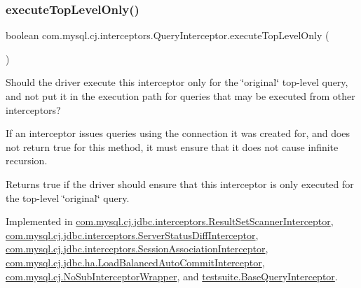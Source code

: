 \mbox{\label{interfacecom_1_1mysql_1_1cj_1_1interceptors_1_1_query_interceptor_ab12edf90713df907ba400dbe3ba03ea6}} 
\subsubsection{\texorpdfstring{execute\+Top\+Level\+Only()}{executeTopLevelOnly()}}
{\footnotesize\ttfamily boolean com.\+mysql.\+cj.\+interceptors.\+Query\+Interceptor.\+execute\+Top\+Level\+Only (\begin{DoxyParamCaption}{ }\end{DoxyParamCaption})}

Should the driver execute this interceptor only for the \char`\"{}original\char`\"{} top-\/level query, and not put it in the execution path for queries that may be executed from other interceptors?

If an interceptor issues queries using the connection it was created for, and does not return {\ttfamily true} for this method, it must ensure that it does not cause infinite recursion.

\begin{DoxyReturn}{Returns}
true if the driver should ensure that this interceptor is only executed for the top-\/level \char`\"{}original\char`\"{} query. 
\end{DoxyReturn}


Implemented in \mbox{\hyperlink{classcom_1_1mysql_1_1cj_1_1jdbc_1_1interceptors_1_1_result_set_scanner_interceptor_a3f3a48cedb6de0c16b6ea146aaff4af0}{com.\+mysql.\+cj.\+jdbc.\+interceptors.\+Result\+Set\+Scanner\+Interceptor}}, \mbox{\hyperlink{classcom_1_1mysql_1_1cj_1_1jdbc_1_1interceptors_1_1_server_status_diff_interceptor_a3234671cd5949383f563d60003d9798b}{com.\+mysql.\+cj.\+jdbc.\+interceptors.\+Server\+Status\+Diff\+Interceptor}}, \mbox{\hyperlink{classcom_1_1mysql_1_1cj_1_1jdbc_1_1interceptors_1_1_session_association_interceptor_a86d3be9b55a93bb96f17d85e39e623c9}{com.\+mysql.\+cj.\+jdbc.\+interceptors.\+Session\+Association\+Interceptor}}, \mbox{\hyperlink{classcom_1_1mysql_1_1cj_1_1jdbc_1_1ha_1_1_load_balanced_auto_commit_interceptor_a048bf25ce3ec24d6db036ec6c4b49884}{com.\+mysql.\+cj.\+jdbc.\+ha.\+Load\+Balanced\+Auto\+Commit\+Interceptor}}, \mbox{\hyperlink{classcom_1_1mysql_1_1cj_1_1_no_sub_interceptor_wrapper_a84d3030e0055b60ed0bb2b56fd5a0dbe}{com.\+mysql.\+cj.\+No\+Sub\+Interceptor\+Wrapper}}, and \mbox{\hyperlink{classtestsuite_1_1_base_query_interceptor_ad806e1659dde0537e052f1825ee6a40e}{testsuite.\+Base\+Query\+Interceptor}}.

